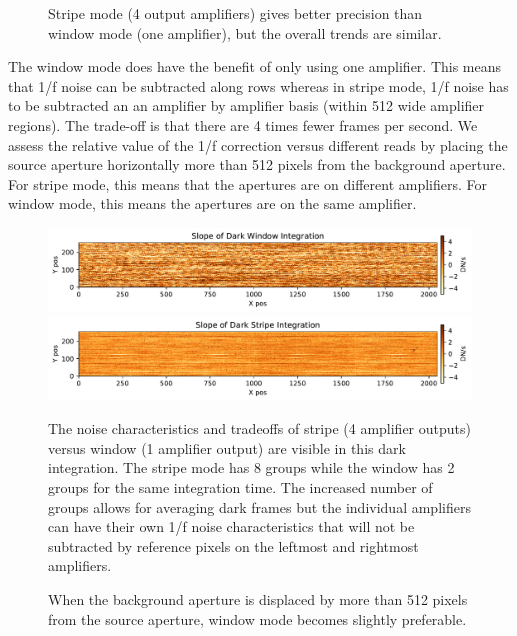 \documentclass{aastex62}
\begin{document}
\begin{figure}
{}
\caption{Stripe mode (4 output amplifiers) gives better precision than window mode (one amplifier), but the overall trends are similar.
}\label{fig:stripeVsWindowAZlab04}
\end{figure}

The window mode does have the benefit of only using one amplifier.
This means that 1/f noise can be subtracted along rows whereas in stripe mode, 1/f noise has to be subtracted an an amplifier by amplifier basis (within 512 wide amplifier regions).
The trade-off is that there are 4 times fewer frames per second.
We assess the relative value of the 1/f correction versus different reads by placing the source aperture horizontally more than 512 pixels from the background aperture.
For stripe mode, this means that the apertures are on different amplifiers.
For window mode, this means the apertures are on the same amplifier.

\begin{figure}[!hbtp]
\centering
\includegraphics[width=0.7\columnwidth]{darkwindow_img.pdf}
\includegraphics[width=.7\columnwidth]{darkstripe_img.pdf}
\caption{The noise characteristics and tradeoffs of stripe (4 amplifier outputs) versus window (1 amplifier output) are visible in this dark integration.
The stripe mode has 8 groups while the window has 2 groups for the same integration time.
The increased number of groups allows for averaging dark frames but the individual amplifiers can have their own 1/f noise characteristics that will not be subtracted by reference pixels on the leftmost and rightmost amplifiers.}\label{fig:darkWindowVsDarkStripe}
\end{figure}


\begin{figure}
{}
\caption{When the background aperture is displaced by more than 512 pixels from the source aperture, window mode becomes slightly preferable.
}\label{fig:stripeVsWindowAZlab04LargerBacksep}
\end{figure}
\end{document}
